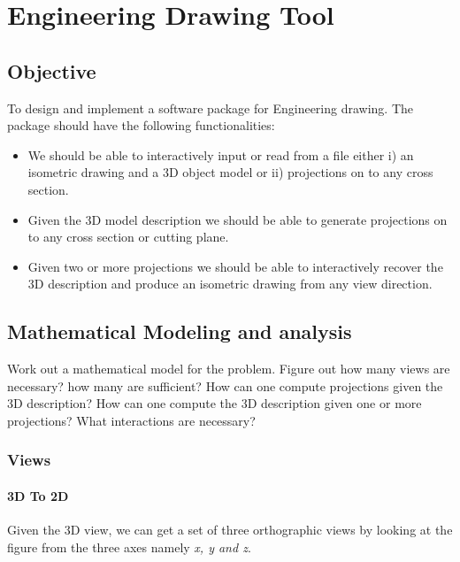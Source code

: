 \documentclass{report}
\begin{document}
\tableofcontents

\chapter{Engineering Drawing Tool}
 
\section*{Objective}
 
To design and implement a software package for Engineering drawing. The package should have the following functionalities:

\begin{itemize}
    \item We should be able to interactively input or read from a file either i) an isometric drawing and a 3D object model or ii) projections on to any cross section.
    
    \item Given the 3D model description we should be able to generate projections on to any cross section or cutting plane.
    
    \item Given two or more projections we should be able to interactively recover the 3D description and produce an isometric drawing from any view direction. 
    
\end{itemize}

\section{Mathematical Modeling and analysis}
 
Work out a mathematical model for the problem. Figure out how many views are necessary? how many are sufficient? How can one compute projections given the 3D description? How can one compute the 3D description given one or more projections? What interactions are necessary?
 
\subsection{Views}

\subsubsection{3D To 2D}

Given the 3D view, we can get a set of three orthographic views by looking at the figure from the three axes namely \textit{x, y and z}.
\end{document}
